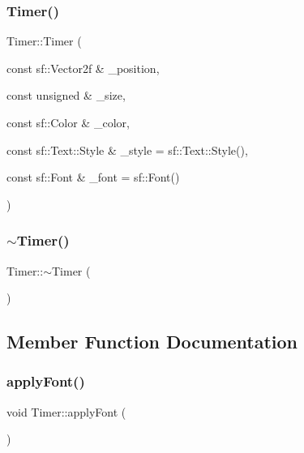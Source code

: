 \mbox{\label{class_timer_a0a933922eec44419c94850e4e16f7121}} 
\subsubsection{\texorpdfstring{Timer()}{Timer()}\hspace{0.1cm}{\footnotesize\ttfamily [2/2]}}
{\footnotesize\ttfamily Timer\+::\+Timer (\begin{DoxyParamCaption}\item[{const sf\+::\+Vector2f \&}]{\+\_\+position,  }\item[{const unsigned \&}]{\+\_\+size,  }\item[{const sf\+::\+Color \&}]{\+\_\+color,  }\item[{const sf\+::\+Text\+::\+Style \&}]{\+\_\+style = {\ttfamily sf\+:\+:Text\+:\+:Style()},  }\item[{const sf\+::\+Font \&}]{\+\_\+font = {\ttfamily sf\+:\+:Font()} }\end{DoxyParamCaption})}

\mbox{\label{class_timer_a14fa469c4c295c5fa6e66a4ad1092146}} 
\subsubsection{\texorpdfstring{$\sim$\+Timer()}{~Timer()}}
{\footnotesize\ttfamily Timer\+::$\sim$\+Timer (\begin{DoxyParamCaption}{ }\end{DoxyParamCaption})}



\subsection{Member Function Documentation}
\mbox{\label{class_timer_a735fb44ab37e1fa12679d5ab291c488d}} 
\subsubsection{\texorpdfstring{apply\+Font()}{applyFont()}}
{\footnotesize\ttfamily void Timer\+::apply\+Font (\begin{DoxyParamCaption}{ }\end{DoxyParamCaption})}

